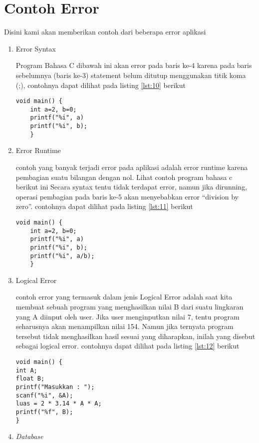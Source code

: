 \chapter{Contoh Error}

\par
Disini kami akan memberikan contoh dari beberapa error aplikasi 

\begin{enumerate}
\item Error Syntax 
\par
Program Bahasa C dibawah ini akan error pada baris ke-4 karena pada baris sebelumnya (baris ke-3) statement belum ditutup menggunakan titik koma (;), contohnya dapat dilihat pada listing \ref{lst:10} berikut
\begin{lstlisting}[caption=Contoh commit standar,label={lst:10}]
	void main() {
	int a=2, b=0;
	printf("%i", a)
	printf("%i", b);
	}
\end{lstlisting}
\item Error Runtime
\par 
contoh yang banyak terjadi error pada aplikasi adalah error runtime karena pembagian suatu bilangan dengan nol. Lihat contoh program bahasa c berikut ini Secara syntax tentu tidak terdapat error, namun jika dirunning, operasi pembagian pada baris ke-5 akan menyebabkan error “division by zero”. contohnya dapat dilihat pada listing \ref{lst:11} berikut
\begin{lstlisting}[caption=Contoh commit standar,label={lst:11}]
	void main() {
	int a=2, b=0;
	printf("%i", a)
	printf("%i", b);
	printf("%i", a/b);
	}
\end{lstlisting}
\item Logical Error
\par
contoh error yang termasuk dalam jenis Logical Error adalah saat kita membuat sebuah program yang menghasilkan nilai B dari suatu lingkaran yang A diinput oleh user. Jika user menginputkan nilai 7, tentu program seharusnya akan menampilkan nilai 154. Namun jika ternyata program tersebut tidak menghasilkan hasil sesuai yang diharapkan, inilah yang disebut sebagai logical error. contohnya dapat dilihat pada listing \ref{lst:12} berikut
\begin{lstlisting}[caption=Contoh commit standar,label={lst:12}]
void main() {
int A;
float B;
printf("Masukkan : ");
scanf("%i", &A);
luas = 2 * 3.14 * A * A;
printf("%f", B);
}
\end{lstlisting}
\item \textit{Database}
\par

\end{enumerate}

